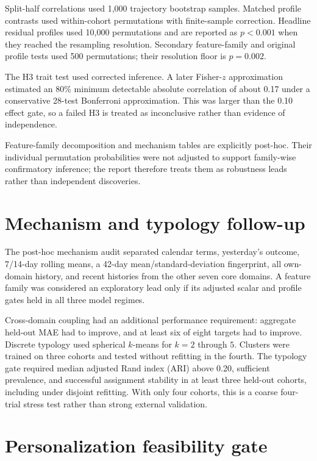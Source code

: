 \documentclass[a4paper,11pt,oneside]{report}
\begin{document}
Split-half correlations used 1,000 trajectory bootstrap samples. Matched profile
contrasts used within-cohort permutations with finite-sample correction. Headline
residual profiles used 10,000 permutations and are reported as $p<0.001$ when they
reached the resampling resolution. Secondary feature-family and original
profile tests used 500 permutations; their resolution floor is $p=0.002$.

The H3 trait test used corrected inference. A later Fisher-$z$ approximation estimated
an 80\% minimum detectable absolute correlation of about 0.17 under a conservative
28-test Bonferroni approximation. This was larger than the 0.10 effect gate, so a
failed H3 is treated as inconclusive rather than evidence of independence.

Feature-family decomposition and mechanism tables are explicitly post-hoc. Their
individual permutation probabilities were not adjusted to support family-wise
confirmatory inference; the report therefore treats them as robustness leads rather
than independent discoveries.

\section{Mechanism and typology follow-up}

The post-hoc mechanism audit separated calendar terms, yesterday's outcome,
7/14-day rolling means, a 42-day mean/standard-deviation fingerprint, all own-domain
history, and recent histories from the other seven core domains. A feature family
was considered an exploratory lead only if its adjusted scalar and profile gates
held in all three model regimes.

Cross-domain coupling had an additional performance requirement: aggregate held-out
MAE had to improve, and at least six of eight targets had to improve. Discrete
typology used spherical $k$-means for $k=2$ through $5$. Clusters were trained on
three cohorts and tested without refitting in the fourth. The typology gate required
median adjusted Rand index (ARI) above 0.20, sufficient prevalence, and successful
assignment stability in at least three held-out cohorts, including under disjoint
refitting. With only four cohorts, this is a coarse four-trial stress test rather
than strong external validation.

\section{Personalization feasibility gate}
\end{document}
